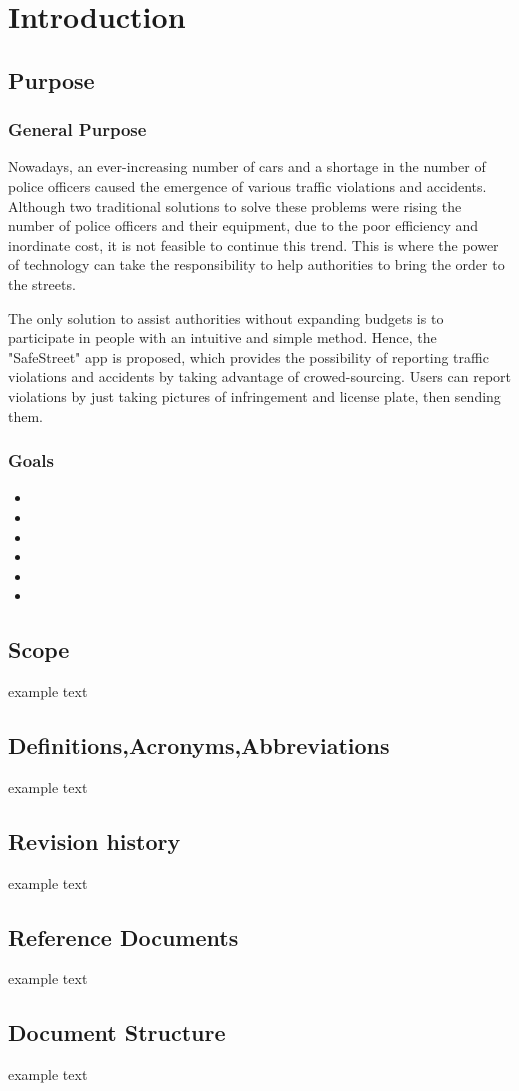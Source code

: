 \section{Introduction}

\subsection{Purpose}
\subsubsection{General Purpose}
Nowadays, an ever-increasing number of cars and a shortage in the number of police officers caused the emergence of various traffic violations and accidents. Although two traditional solutions to solve these problems were rising the number of police officers and their equipment, due to the poor efficiency and inordinate cost, it is not feasible to continue this trend. This is where the power of technology can take the responsibility to help authorities to bring the order to the streets.

The only solution to assist authorities without expanding budgets is to participate in people with an intuitive and simple method. Hence, the "SafeStreet" app is proposed, which provides the possibility of reporting traffic violations and accidents by taking advantage of crowed-sourcing. Users can report violations by just taking pictures of infringement and license plate, then sending them.
\subsubsection{Goals}
\begin{itemize}
\item  {}
\item  {}
\item  {}
\item  {}
\item  {}
\item  {}
\end{itemize}

\subsection{Scope}
	example text


\subsection{Definitions,Acronyms,Abbreviations}
	example text


\subsection{Revision history}
	example text


\subsection{Reference Documents}
	example text


\subsection{Document Structure}
	example text

